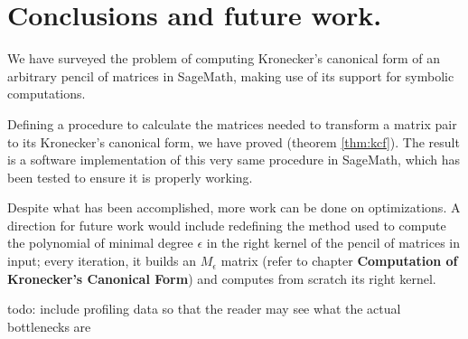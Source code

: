 \section{Conclusions and future work.}
We have surveyed the problem of computing Kronecker's canonical form of an arbitrary pencil of matrices in SageMath,
making use of its support for symbolic computations.

Defining a procedure to calculate the matrices needed to transform a matrix pair to its Kronecker's canonical form,
we have proved  (theorem \ref{thm:kcf}). The result is a software implementation of this very same
procedure in SageMath\cite{Trapani_Computation_of_Kronecker_s}, which has been tested to ensure it is properly working.

Despite what has been accomplished, more work can be done on optimizations. A direction for future work
would include redefining the method used to compute the polynomial of minimal degree \(\epsilon\) in the right kernel of
the pencil of matrices in input; every iteration, it builds an \(M_\epsilon\) matrix (refer to chapter
\textbf{Computation of Kronecker's Canonical Form}) and computes from scratch its right kernel.

todo: include profiling data so that the reader may see what the actual bottlenecks are